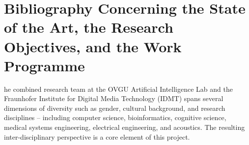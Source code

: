 \documentclass[11pt]{article}
\begin{document}



\renewcommand{\refname}{Bibliography Concerning the State of the Art, the Research Objectives, and the Work Programme}
\section{Bibliography Concerning the State of the Art, the Research Objectives, and the Work Programme}
\begingroup
\renewcommand{\section}[2]{}%

\endgroup

\section{Relevance of sex, gender and/or diversity}
The combined research team at the OVGU Artificial Intelligence Lab and the Fraunhofer Institute for Digital Media Technology (IDMT) spans several dimensions of diversity such as gender, cultural background, and research disciplines -- including computer science, bioinformatics, cognitive science, medical systems engineering, electrical engineering, and acoustics.
The resulting inter-disciplinary perspective is a core element of this project.
\end{document}
